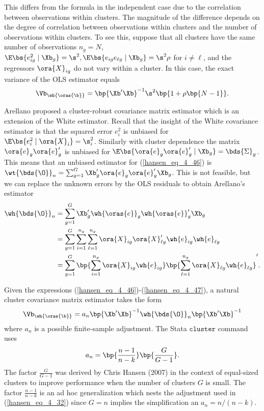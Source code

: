 This differs from the formula in the independent case due to the correlation between observations within clusters. The magnitude of the difference depends on the degree of correlation between observations within clusters and the number of observations within clusters. To see this, suppose that all clusters have the same number of observations $n_g = N$, $\E\bs{e_{ig}^2 \mid \Xb_g} = \s^2, \E\bs{e_{ig} e_{\ell g} \mid \Xb_g} = \s^2 \rho$ for $i \neq \ell$, and the regressors $\ora{X}_{ig}$ do not vary within a cluster. In this case, the exact variance of the OLS estimator equals 
\begin{equation}
    \label{hansen_eq_4_48}
    \Vb_{\wh{\oras{\b}}} = \bp{\Xb^\prime \Xb}^{-1} \s^2 \bp{ 1 + \rho \bp{N-1}}.
\end{equation}

Arellano proposed a cluster-robust covariance matrix estimator which is an extension of the White estimator. Recall that the insight of the White covariance estimator is that the squared error $e_i^2$ is unbiased for $\E\bs{e_i^2 \mid \ora{X}_i} = \s_i^2$. Similarly with cluster dependence the matrix $\ora{e}_g \ora{e}_g^\prime$ is unbiased for $\E\bs{\ora{e}_g \ora{e}_g^\prime \mid \Xb_g} = \bds{\Sigma}_g$. This means that an unbiased estimator for (\ref{hansen_eq_4_46}) is $\wt{\bds{\O}}_n = \sum_{g=1}^{G} \Xb_g^\prime \ora{e}_g \ora{e}_g^\prime \Xb_g$. This is not feasible, but we can replace the unknown errors by the OLS residuals to obtain Arellano's estimator 
\begin{equation}
    \label{hansen_eq_4_49}
    \begin{aligned}
        \wh{\bds{\O}}_n & = \sum_{g=1}^{G} \Xb_g^\prime \wh{\oras{e}}_g \wh{\oras{e}}_g^\prime \Xb_g \\
        & = \sum_{g=1}^{G} \sum_{i=1}^{n_g} \sum_{\ell = 1}^{n_g} \ora{X}_{ig} \ora{X}_{\ell g}^\prime \wh{e}_{ig} \wh{e}_{\ell g} \\
        & = \sum_{g=1}^{G} \bp{\sum_{i=1}^{n_g}\ora{X}_{ig}\wh{e}_{ig}} \bp{\sum_{\ell = 1}^{n_g} \ora{X}_{\ell g} \wh{e}_{\ell g}}^\prime .
    \end{aligned}
\end{equation}

Given the expressions (\ref{hansen_eq_4_46})-(\ref{hansen_eq_4_47}), a natural cluster covariance matrix estimator takes the form 
\begin{equation}
    \label{hansen_eq_4_50}
    \Vb_{\wh{\oras{\b}}} = a_n \bp{\Xb^\prime \Xb}^{-1} \wh{\bds{\O}}_n \bp{\Xb^\prime \Xb}^{-1}
\end{equation}
where $a_n$ is a possible finite-sample adjustment. The Stata $\mathtt{cluster}$ command uses 
\begin{equation}
    \label{hansen_eq_4_51}
    a_n = \bp{\frac{n-1}{n-k}} \bp{\frac{G}{G-1}}.
\end{equation}
The factor $\frac{G}{G-1}$ was derived by Chris Hansen (2007) in the context of equal-sized clusters to improve performance when the number of clusters $G$ is small. The factor $\frac{n-1}{n-k}$ is an ad hoc generalization which nests the adjustment used in (\ref{hansen_eq_4_32}) since $G=n$ implies the simplification an $a_n = n/(n-k)$.

